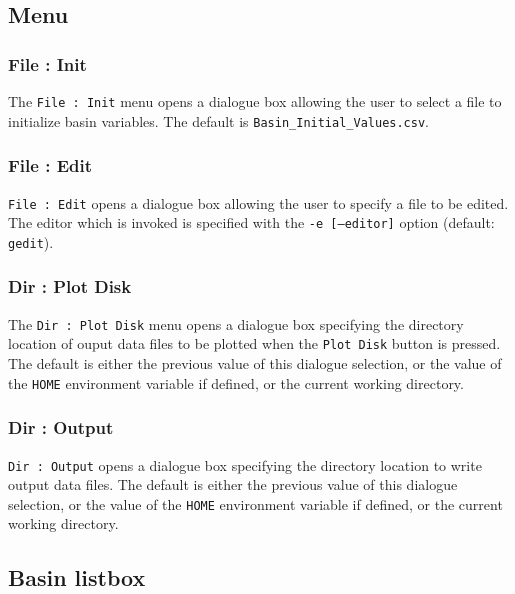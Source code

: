 
\subsection{Menu}
\label{sec:Menu}
\subsubsection{File : Init}
The \texttt{File : Init} menu opens a dialogue box allowing the user to select a file to initialize basin variables.  The default is \texttt{Basin\_Initial\_Values.csv}.

\subsubsection{File : Edit}
\texttt{File : Edit} opens a dialogue box allowing the user to specify a file to be edited.  The editor which is invoked is specified with the \texttt{-e [--editor]} option (default: \texttt{gedit}). 

\subsubsection{Dir : Plot Disk}
The \texttt{Dir : Plot Disk} menu opens a dialogue box specifying the directory location of ouput data files to be plotted when the \texttt{Plot Disk} button is pressed.  The default is either the previous value of this dialogue selection, or the value of the \texttt{HOME} environment variable if defined, or the current working directory.

\subsubsection{Dir : Output}
\texttt{Dir : Output} opens a dialogue box specifying the directory location to write output data files.  The default is either the previous value of this dialogue selection, or the value of the \texttt{HOME} environment variable if defined, or the current working directory.

\clearpage
\subsection{Basin listbox}
\label{sec:Basin listbox}


